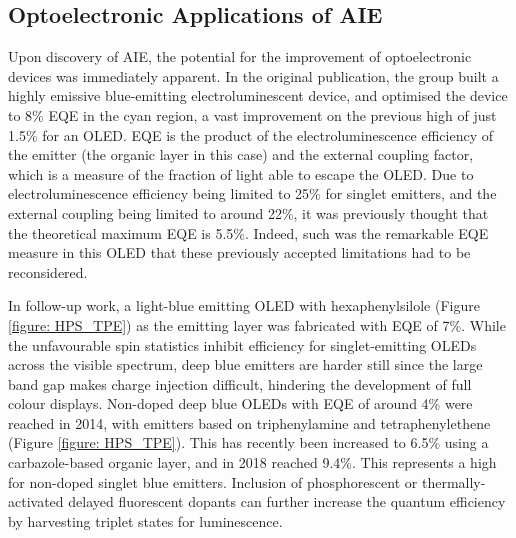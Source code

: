 \subsection{Optoelectronic Applications of AIE}
Upon discovery of \ac{AIE}, the potential for the improvement of optoelectronic devices was immediately apparent. In the original publication, the group built a highly emissive blue-emitting electroluminescent device, and optimised the device to 8\% \ac{EQE} in the cyan region, a vast improvement on the previous high of just 1.5\% for an \ac{OLED}. \cite{Luo2001,Chen2002} \ac{EQE} is the product of the electroluminescence efficiency of the emitter (the organic layer in this case) and the external coupling factor, which is a measure of the fraction of light able to escape the \ac{OLED}. Due to electroluminescence efficiency being limited to 25\% for singlet emitters, and the external coupling being limited to around 22\%, it was previously thought that the theoretical maximum \ac{EQE} is 5.5\%. Indeed, such was the remarkable \ac{EQE} measure in this \ac{OLED} that these previously accepted limitations had to be reconsidered.

In follow-up work, a light-blue emitting \ac{OLED} with hexaphenylsilole (Figure \ref{figure: HPS_TPE}) as the emitting layer was fabricated with \ac{EQE} of 7\%.\cite{Chen2003} While the unfavourable spin statistics inhibit efficiency for singlet-emitting \acp{OLED} across the visible spectrum, deep blue emitters are harder still since the large band gap makes charge injection difficult, hindering the development of full colour displays. Non-doped deep blue \acp{OLED} with \ac{EQE} of around 4\% were reached in 2014, with emitters based on triphenylamine and tetraphenylethene (Figure \ref{figure: HPS_TPE}).\cite{Huang2014,Huang2014a} This has recently been increased to 6.5\% using a carbazole-based organic layer, and in 2018 reached 9.4\%.\cite{KumarKonidena2017,Tang2018} This represents a high for non-doped singlet blue emitters. Inclusion of phosphorescent or thermally-activated delayed fluorescent dopants can further increase the quantum efficiency by harvesting triplet states for luminescence.\cite{Zhu2018}

